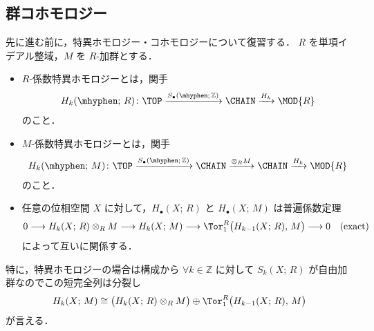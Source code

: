 \documentclass[TQFT_main]{subfiles}
\begin{document}
\subsection{群コホモロジー}

先に進む前に，特異ホモロジー・コホモロジーについて復習する．
$R$ を単項イデアル整域，$M$ を $R$-加群とする．
\begin{itemize}
    \item 
    $R$-係数特異ホモロジーとは，関手
    \begin{align}
        H_k (\mhyphen ;\, R)\colon \TOP \xrightarrow{S_{\bullet}(\mhyphen ;\, \mathbb{Z})} \CHAIN \xrightarrow{H_k} \MOD{R}
    \end{align}
    のこと．
    \item 
    $M$-係数特異ホモロジーとは，関手
    \begin{align}
        H_k (\mhyphen ;\, M)\colon \TOP \xrightarrow{S_{\bullet}(\mhyphen ;\, \mathbb{Z})} \CHAIN \xrightarrow{\otimes_R M} \CHAIN \xrightarrow{H_k} \MOD{R}
    \end{align}
    のこと．
    \item 
    任意の位相空間 $X$ に対して，$H_\bullet (X;\, R)$ と $H_\bullet (X;\, M)$ は普遍係数定理
    \begin{align}
        \label{eq:univ-coeff}
        0 \lto H_k(X;\, R) \otimes_R M \lto H_k(X;\, M) \lto \Tor_1^R \bigl( H_{k-1}(X;\, R),\, M \bigr) \lto 0 \quad (\text{exact})
    \end{align}
    によって互いに関係する．
\end{itemize}
特に，特異ホモロジーの場合は構成から $\forall k \in \mathbb{Z}$ に対して $S_k(X;\, R)$ が自由加群なのでこの短完全列は分裂し
\begin{align}
    H_k (X;\, M) \cong \bigl( H_k(X;\, R) \otimes_R M \bigr) \oplus \Tor_1^R \bigl( H_{k-1}(X;\, R),\, M \bigr)
\end{align}
が言える．
\end{document}
